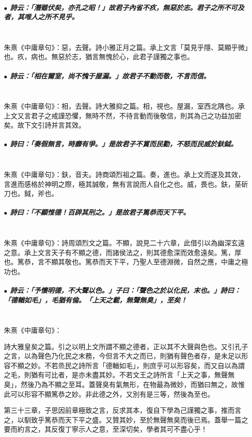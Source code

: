 \documentclass[hyperref, UTF8, 12pt, a4paper]{ctexrep}
\begin{document}
\subparagraph{$\bullet$ 詩云：「潛雖伏矣，亦孔之昭！」故君子內省不疚，無惡於志。君子之所不可及者，其唯人之所不見乎。} ~\\

朱熹《中庸章句》：惡，去聲。詩小雅正月之篇。承上文言「莫見乎隱、莫顯乎微」也。疚，病也。無惡於志，猶言無愧於心，此君子謹獨之事也。

\subparagraph{$\bullet$ 詩云：「相在爾室，尚不愧于屋漏。」故君子不動而敬，不言而信。} ~\\

朱熹《中庸章句》：相，去聲。詩大雅抑之篇。相，視也。屋漏，室西北隅也。承上文又言君子之戒謹恐懼，無時不然，不待言動而後敬信，則其為己之功益加密矣。故下文引詩并言其效。

\subparagraph{$\bullet$ 詩曰：「奏假無言，時靡有爭。」是故君子不賞而民勸，不怒而民威於鈇鉞。} ~\\

朱熹《中庸章句》：鈇，音夫。詩商頌烈祖之篇。奏，進也。承上文而遂及其效，言進而感格於神明之際，極其誠敬，無有言說而人自化之也。威，畏也。鈇，莝斫刀也。鉞，斧也。

\subparagraph{$\bullet$ 詩曰：「不顯惟德！百辟其刑之。」是故君子篤恭而天下平。} ~\\

朱熹《中庸章句》：詩周頌烈文之篇。不顯，說見二十六章，此借引以為幽深玄遠之意。承上文言天子有不顯之德，而諸侯法之，則其德愈深而效愈遠矣。篤，厚也。篤恭，言不顯其敬也。篤恭而天下平，乃聖人至德淵微，自然之應，中庸之極功也。

\subparagraph{$\bullet$ 詩云：「予懷明德，不大聲以色。」子曰：「聲色之於以化民，末也。」詩曰：「德輶如毛」，毛猶有倫。「上天之載，無聲無臭」，至矣！} ~\\

朱熹《中庸章句》：

\begin{adjustwidth}{2cm}{1cm}
\indent\indent 詩大雅皇矣之篇。引之以明上文所謂不顯之德者，正以其不大聲與色也。又引孔子之言，以為聲色乃化民之末務，今但言不大之而已，則猶有聲色者存，是未足以形容不顯之妙。不若烝民之詩所言「德輶如毛」，則庶乎可以形容矣，而又自以為謂之毛，則猶有可比者，是亦未盡其妙。不若文王之詩所言「上天之事，無聲無臭」，然後乃為不顯之至耳。蓋聲臭有氣無形，在物最為微妙，而猶曰無之，故惟此可以形容不顯篤恭之妙。非此德之外，又別有是三等，然後為至也。

第三十三章，子思因前章極致之言，反求其本，復自下學為己謹獨之事，推而言之，以馴致乎篤恭而天下平之盛。又贊其妙，至於無聲無臭而後已焉。蓋舉一篇之要而約言之，其反復丁寧示人之意，至深切矣，學者其可不盡心乎！
\end{adjustwidth}
\end{document}
